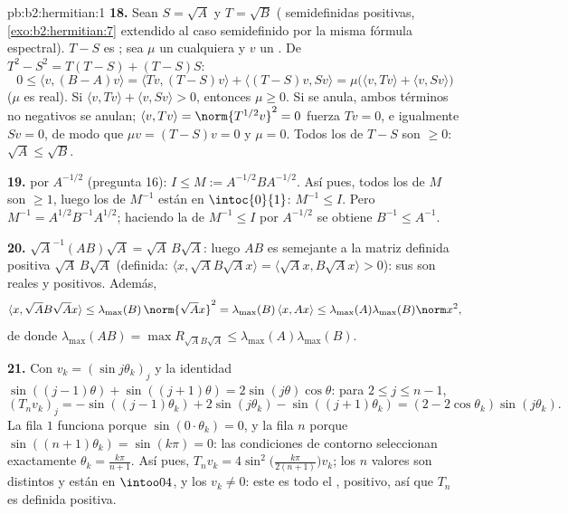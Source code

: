 \begin{solution}{pb:b2:hermitian:1}
\textbf{18.} Sean $S = \sqrt A$ y $T = \sqrt B$ (
semidefinidas positivas, \cref{exo:b2:hermitian:7} extendido al caso
semidefinido por la misma fórmula espectral). $T - S$ es ;
sea $\mu$ un  cualquiera y $v$ un 
. De $T^2 - S^2 = T(T - S) + (T - S)S$:
\[
0 \leq \langle v, (B - A)v\rangle
= \langle Tv, (T-S)v\rangle + \langle (T-S)v, Sv\rangle
= \mu\bigl(\langle v, Tv\rangle + \langle v,
Sv\rangle\bigr)
\]
($\mu$ es real). Si $\langle v, Tv\rangle + \langle v, Sv\rangle >
0$, entonces $\mu \geq 0$. Si se anula, ambos términos no negativos
se anulan; $\langle v, Tv\rangle = \norm{T^{1/2}v}^2 = 0$ fuerza $Tv
= 0$, e igualmente $Sv = 0$, de modo que $\mu v = (T - S)v = 0$ y
$\mu = 0$. Todos los  de $T - S$ son $\geq 0$: $\sqrt A
\leq \sqrt B$.

\textbf{19.}  por $A^{-1/2}$ (pregunta 16): $I \leq M :=
A^{-1/2}BA^{-1/2}$. Así pues, todos los  de $M$ son
$\geq 1$, luego los de $M^{-1}$ están en $\intoc{0}{1}$: $M^{-1} \leq
I$. Pero $M^{-1} = A^{1/2}B^{-1}A^{1/2}$; haciendo la  de
$M^{-1} \leq I$ por $A^{-1/2}$ se obtiene $B^{-1} \leq A^{-1}$.

\textbf{20.} $\sqrt A^{-1}(AB)\sqrt A = \sqrt A\,B\sqrt A$: luego
$AB$ es semejante a la matriz  definida positiva $\sqrt
A\,B\sqrt A$ (definida: $\langle x, \sqrt AB\sqrt Ax\rangle = \langle
\sqrt Ax, B\sqrt Ax\rangle > 0$): sus  son reales y
positivos. Además,
\[
\langle x, \sqrt AB\sqrt Ax\rangle
\leq \lambda_{\max}(B)\,\norm{\sqrt Ax}^2
= \lambda_{\max}(B)\,\langle x, Ax\rangle
\leq \lambda_{\max}(A)\lambda_{\max}(B)\norm x^2 ,
\]
de donde $\lambda_{\max}(AB) = \max R_{\sqrt AB\sqrt A} \leq
\lambda_{\max}(A)\lambda_{\max}(B)$.

\textbf{21.} Con $v_k = (\sin j\theta_k)_j$ y la identidad
$\sin((j-1)\theta) + \sin((j+1)\theta) = 2\sin(j\theta)\cos\theta$:
para $2 \leq j \leq n-1$,
\[
(T_nv_k)_j = -\sin((j{-}1)\theta_k) + 2\sin(j\theta_k) -
\sin((j{+}1)\theta_k)
= (2 - 2\cos\theta_k)\sin(j\theta_k) .
\]
La fila $1$ funciona porque $\sin(0\cdot\theta_k) = 0$, y la fila $n$
porque $\sin((n+1)\theta_k) = \sin(k\pi) = 0$: las condiciones de
contorno seleccionan exactamente $\theta_k = \frac{k\pi}{n+1}$. Así
pues, $T_nv_k = 4\sin^2\bigl(\frac{k\pi}{2(n+1)}\bigr)v_k$; los $n$
valores son distintos y están en $\intoo04$, y los $v_k \neq 0$: este
es todo el , positivo, así que $T_n$ es definida positiva.


\end{solution}
